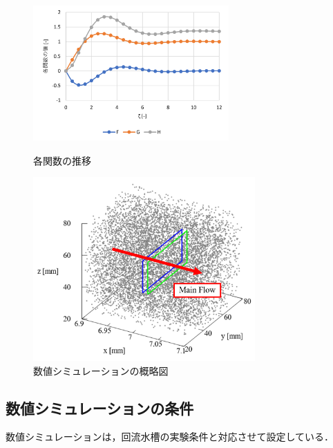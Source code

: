 \documentclass[twocolumn,a4j]{jsarticle}
\begin{document}
\begin{figure}[htbp]
  \footnotesize
  \begin{center}
    \includegraphics[width=75mm]{../images/function_graph.png}
    \caption{各関数の推移}
    \includegraphics[width=85mm]{../images/Numerical_simulation_of_flow.png}
    \caption{数値シミュレーションの概略図}
  \end{center}
\end{figure}

\newpage
\subsection{数値シミュレーションの条件}
数値シミュレーションは，回流水槽の実験条件と対応させて設定している．
\end{document}
